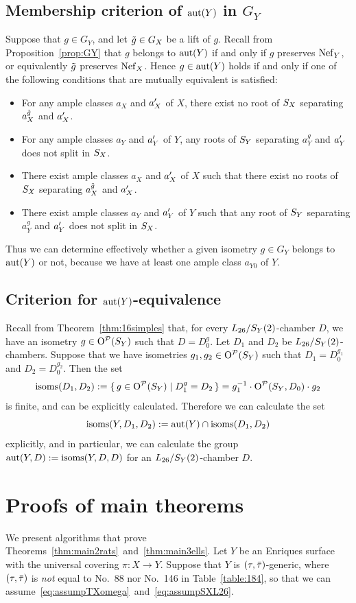 \documentclass{amsart}
\numberwithin{procedure}{section}
\begin{document}
\subsection{Membership criterion of $\mathord{\rm{aut}}(Y)$ in  $ G_Y$}\label{subsec:Membership2}
%
%
Suppose that $g\in G_Y$, 
and let $\tilde{g} \in G_X$ be a lift  
of $g$.
Recall from Proposition~\ref{prop:GY}
 that $g$ belongs to $\mathord{\rm{aut}}(Y)$ if and only if $g$ preserves $\mathord{\rm Nef}_{Y}$,
or equivalently $\tilde{g}$ preserves $\mathord{\rm Nef}_{X}$.
Hence $g\in\mathord{\rm{aut}}(Y)$ holds if and only if one of the following conditions
that are mutually equivalent is satisfied:
%
\begin{itemize}
\item For any ample classes $a_X$ and $a_X\sp\prime$ of $X$,
there exist no root 
of $S_{X}$ separating $a_X^{\tilde{g}}$ and $a_X\sp\prime$.
\item For any ample classes $a_Y$ and $a_Y\sp\prime$ of $Y$,
any  roots of $S_{Y}$ separating $a_Y^{g}$ and $a_Y\sp\prime$
does not split in $S_{X}$.
\item There exist ample classes $a_X$ and $a_X\sp\prime$ of $X$
such that 
there exist no roots of $S_{X}$ separating $a_X^{\tilde{g}}$ and $a_X\sp\prime$.
\item  There exist ample classes $a_Y$ and $a_Y\sp\prime$ of $Y$ such that 
any root 
of $S_{Y}$ separating $a_Y^{g}$ and $a_Y\sp\prime$
does not split in $S_{X}$.
\end{itemize}
%
Thus we can determine effectively whether 
a given isometry $g\in G_Y$ belongs to $\mathord{\rm{aut}}(Y)$ or not,
because we have at least one ample class $a_{Y0}$ of $Y$.
%
\subsection{Criterion for $\mathord{\rm{aut}}(Y)$-equivalence}\label{subsec:criterionGequiv}
%
Recall from Theorem~\ref{thm:16simples} that, 
for every $L_{26}/S_Y(2)$-chamber $D$,
we have an isometry $g\in \mathord{\mathrm{O}}^{\mathord{\mathcal P}}(S_{Y})$ such that $D=D_0^g$.
Let $D_1$ and $D_2$ be $L_{26}/S_Y(2)$-chambers.
Suppose that we have
isometries $g_1, g_2\in \mathord{\mathrm{O}}^{\mathord{\mathcal P}}(S_{Y})$  such that $D_1=D_0^{g_1}$ and $D_2=D_0^{g_2}$.
Then the set
\[
\mathord{\rm isoms}(D_1, D_2):=\{\,{g\in \mathord{\mathrm{O}}^{\mathord{\mathcal P}}(S_{Y})}\mid {D_1^g=D_2} \,\}=g_1\sp{-1} \cdot \mathord{\mathrm{O}}^{\mathord{\mathcal P}}(S_{Y}, D_0) \cdot g_2
\]
is finite, and can be explicitly calculated.
Therefore we can calculate the set 
\[
\mathord{\rm isoms}(Y, D_1, D_2):=\mathord{\rm{aut}} (Y)\cap \mathord{\rm isoms}(D_1, D_2)
\]
explicitly, and in particular, we can calculate the group
$\mathord{\rm{aut}}(Y, D):=\mathord{\rm isoms}(Y, D, D)$
for an $L_{26}/S_Y(2)$-chamber $D$.
%
%
\section{Proofs of main theorems}\label{sec:proofs}
% 
We present algorithms that
prove
Theorems~\ref{thm:main2rats}~and~\ref{thm:main3ells}.
Let $Y$ be an Enriques surface with the universal covering $\pi\colon X\to Y$.
Suppose that $Y$ is $(\tau, \bar{\tau})$-generic,
where $(\tau, \bar{\tau})$ is \emph{not} equal to No.~88 nor No.~146
in Table~\ref{table:184}, so that 
we can assume~\eqref{eq:assumpTXomega}~and~\eqref{eq:assumpSXL26}.
%
\end{document}

